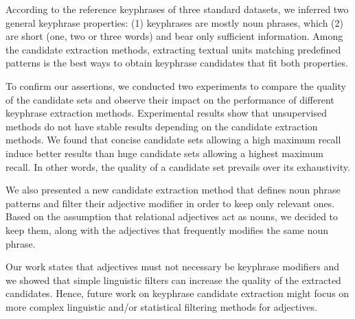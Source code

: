   According to the reference keyphrases of three standard datasets, we inferred
  two general keyphrase properties: (1) keyphrases are mostly noun phrases,
  which (2) are short (one, two or three words) and bear only sufficient
  information. Among the candidate extraction methods, extracting textual units
  matching predefined patterns is the best ways to obtain keyphrase candidates
  that fit both properties.

  To confirm our assertions, we conducted two experiments to compare the quality
  of the candidate sets and observe their impact on the performance of different
  keyphrase extraction methods. Experimental results show that unsupervised
  methods do not have stable results depending on the candidate extraction
  methods. We found that concise candidate sets allowing a high maximum recall
  induce better results than huge candidate sets allowing a highest maximum
  recall. In other words, the quality of a candidate set prevails over its
  exhaustivity.


  We also presented a new candidate extraction method that defines noun phrase
  patterns and filter their adjective modifier in order to keep only relevant
  ones. Based on the assumption that relational adjectives act as nouns, we
  decided to keep them, along with the adjectives that frequently modifies the
  same noun phrase.

  Our work states that adjectives must not necessary be keyphrase modifiers and
  we showed that simple linguistic filters can increase the quality of the
  extracted candidates. Hence, future work on keyphrase candidate extraction
  might focus on more complex linguistic and/or statistical filtering methods
  for adjectives.

